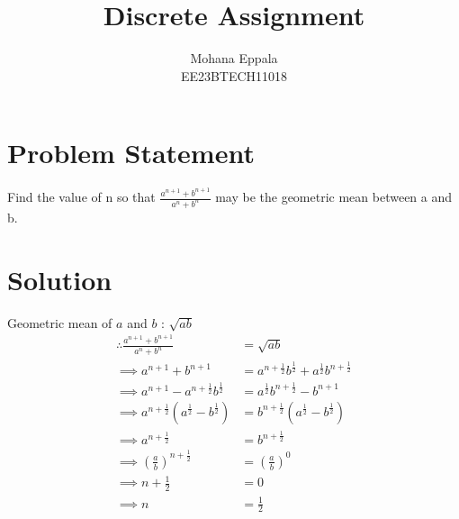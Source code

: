 \documentclass[12pt]{article}
\begin{document}
\title{Discrete Assignment}
\author{Mohana Eppala\\ EE23BTECH11018}
\maketitle

\section*{Problem Statement}
Find the value of n so that $\frac{a^{n+1} + b^{n+1}}{a^{n}+b^{n}}$ may be the geometric mean between a and b.
\section{Solution}

\begin{table}[H]

\end{table}

Geometric mean of $a$ and $b$ : $\sqrt{ab}$
\begin{align}
\therefore \frac{a^{n+1} + b^{n+1}}{a^{n}+b^{n}} &= \sqrt{ab} \\
\implies a^{n+1} + b^{n+1} &= a^{n+\frac{1}{2}}b^{\frac{1}{2}} + a^{\frac{1}{2}}b^{n+\frac{1}{2}} \\
\implies a^{n+1} - a^{n+\frac{1}{2}}b^{\frac{1}{2}} &=  a^{\frac{1}{2}}b^{n+\frac{1}{2}} - b^{n+1} \\
\implies a^{n+\frac{1}{2}}(a^{\frac{1}{2}} - b^{\frac{1}{2}}) &= b^{n+\frac{1}{2}}(a^{\frac{1}{2}} - b^{\frac{1}{2}}) \\
\implies a^{n+\frac{1}{2}} &= b^{n+\frac{1}{2}} \\
\implies (\frac{a}{b})^{n+\frac{1}{2}} &= (\frac{a}{b})^{0} \\
\implies n + \frac{1}{2} &= 0 \\
\implies n &= \frac{1}{2}
\end{align}
\end{document}
